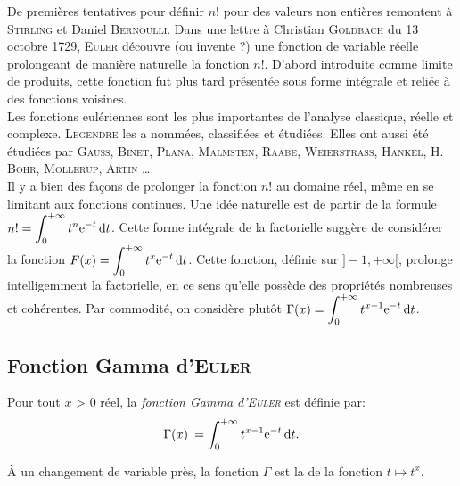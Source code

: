 De premières tentatives pour définir $n!$ pour des valeurs non entières remontent à \textsc{Stirling} et Daniel \textsc{Bernoulli}. Dans une lettre à Christian \textsc{Goldbach} du 13 octobre 1729, \textsc{Euler} découvre (ou invente ?) une fonction de variable réelle prolongeant de manière naturelle la fonction $n!$. D'abord introduite comme limite de produits, cette fonction fut plus tard présentée sous forme intégrale et reliée à des fonctions voisines. \\
Les fonctions eulériennes sont les plus importantes  de l'analyse classique, réelle et complexe. \textsc{Legendre} les a nommées, classifiées et étudiées. Elles ont aussi été étudiées par \textsc{Gauss}, \textsc{Binet}, \textsc{Plana}, \textsc{Malmsten}, \textsc{Raabe}, \textsc{Weierstrass}, \textsc{Hankel}, H. \textsc{Bohr}, \textsc{Mollerup}, \textsc{Artin} \dots \\
Il y a bien des façons de prolonger la fonction $n!$ au domaine réel, même en se limitant aux fonctions continues. Une idée naturelle est de partir de la formule $\displaystyle n! = \int_{0}^{+ \infty} t^n \mathrm{e}^{-t} \, \mathrm{d} t$. Cette forme intégrale de la factorielle suggère de considérer la fonction $\displaystyle F(x)=\int_{0}^{+ \infty} t^x \mathrm{e}^{-t} \, \mathrm{d} t$. Cette fonction, définie sur $]-1, +\infty[$, prolonge intelligemment la factorielle, en ce sens qu'elle possède des propriétés nombreuses et cohérentes. Par commodité, on considère plutôt $\displaystyle \Gamma(x) = \int_{0}^{+ \infty} t^{x-1} \mathrm{e}^{-t} \, \mathrm{d} t$.

\subsection{Fonction Gamma d'\textsc{Euler}}

%    

\begin{defi}
    Pour tout $x$ > 0 réel, la \emph{fonction Gamma d'\textsc{Euler}} est définie par: 
    $$\Gamma(x) \defeq \int_{0}^{+\infty} t^{x-1} \me^{-t} \d t.$$
\end{defi}

\begin{remarque}
    À un changement de variable près, la fonction $\Gamma$ est la  de la fonction $t \mapsto t^x$. 
\end{remarque} 

